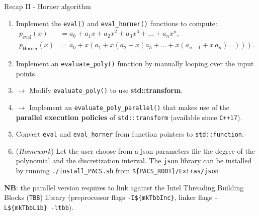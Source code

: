 \documentclass[10pt,aspectratio=169]{beamer}
\begin{document}
\begin{frame}{Recap II - Horner algorithm}
		
\begin{enumerate}
    \item Implement the \texttt{eval()} and \texttt{eval\_horner()} functions to compute:
    \begin{align*}
        p_\text{eval}(x) &= a_0 + a_1x + a_2x^2 + a_3x^3 + \ldots + a_nx^n, \\
        p_\text{Horner}(x) &= a_0 + x \left(a_1 + x \left(a_2 + x \left(a_3 + \ldots + x\left(a_{n-1} + x \, a_n\right) \ldots \right) \right) \right).
    \end{align*}
    \item Implement an \texttt{evaluate\_poly()} function by manually looping over the input points.
    \item $\rightarrow$ Modify \texttt{evaluate\_poly()} to use \textbf{ std::transform}.
    \item $\rightarrow$ Implement an \texttt{evaluate\_poly\_parallel()} that makes use of the \textbf{parallel execution policies} of \texttt{std::transform} (available since \texttt{C++17}).
    \item Convert \texttt{eval} and \texttt{eval\_horner} from function pointers to \texttt{std::function}.
    \item (\textit{Homework}) Let the user choose from a json parameters file the degree of the polynomial and the discretization interval. The \texttt{json} library can be installed by running \texttt{./install\_PACS.sh} from \texttt{\$\{PACS\_ROOT\}/Extras/json}
\end{enumerate}

\textbf{NB}: the parallel version requires to link against the Intel Threading Building Blocks (\texttt{TBB}) library (preprocessor flags \texttt{-I\$\{mkTbbInc\}}, linker flags \texttt{-L\$\{mkTbbLib\} -ltbb}).
\end{frame}
\end{document}
